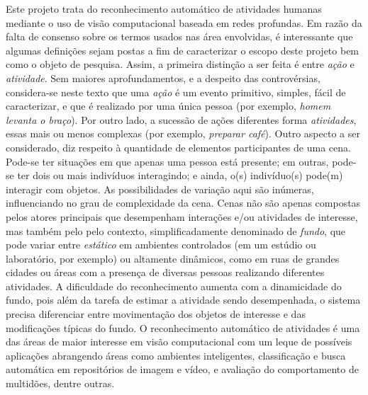 Este projeto trata do reconhecimento automático de atividades humanas mediante o uso de visão computacional baseada em redes profundas. Em razão da falta de consenso sobre os termos usados nas área envolvidas, é interessante que algumas definições sejam postas a fim de caracterizar o escopo deste projeto bem como o objeto de pesquisa. 
%
Assim, a primeira distinção a ser feita é entre \emph{ação} e \emph{atividade}. Sem maiores aprofundamentos, e a despeito das controvérsias, considera-se neste texto que uma \emph{ação} é um evento primitivo, simples, fácil de caracterizar, e que é realizado por uma única pessoa (por exemplo, \emph{homem levanta o braço}). Por outro lado, a sucessão de ações diferentes forma \emph{atividades}, essas mais ou menos complexas (por exemplo, \emph{preparar café}). 
%
Outro aspecto a ser considerado, diz respeito à quantidade de elementos participantes de uma cena. Pode-se ter situações em que apenas uma pessoa está presente; em outras, pode-se ter dois ou mais indivíduos interagindo; e ainda, o(s) indivíduo(s) pode(m) interagir com objetos. As possibilidades de variação aqui são inúmeras, influenciando no grau de complexidade da cena.
%
Cenas não são apenas compostas pelos atores principais que desempenham interações e/ou atividades de interesse, mas também pelo pelo contexto, simplificadamente denominado de \emph{fundo}, que pode variar entre \emph{estático} em ambientes controlados (em um estúdio ou laboratório, por exemplo) ou altamente dinâmicos, como em ruas de grandes cidades ou áreas com a presença de diversas pessoas realizando diferentes atividades. A dificuldade do reconhecimento aumenta com a dinamicidade do fundo, pois além da tarefa de estimar a atividade sendo desempenhada, o sistema precisa diferenciar entre movimentação dos objetos de interesse e das modificações típicas do fundo.
%
O reconhecimento automático de atividades é uma das áreas de maior interesse em visão computacional com um leque de possíveis aplicações abrangendo áreas como ambientes inteligentes, classificação e busca automática em repositórios de imagem e vídeo, e avaliação do comportamento de multidões, dentre outras.
%
